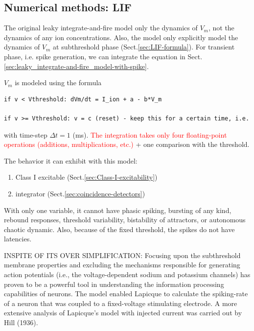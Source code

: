 % 




\subsection{Numerical methods: LIF}

The original leaky integrate-and-fire model only the dynamics of $V_m$, not the
dynamics of any ion concentrations.
Also, the model only explicitly model the dynamics of $V_m$ at subthreshold
phase (Sect.\ref{sec:LIF-formula}). For transient phase, i.e. spike generation,
we can integrate the equation in
Sect.\ref{sec:leaky_integrate-and-fire_model-with-spike}.


$V_m$ is modeled using the formula
\begin{verbatim}
if v < Vthreshold: dVm/dt = I_ion + a - b*V_m

if v >= Vthreshold: v = c (reset) - keep this for a certain time, i.e. 
\end{verbatim}
with time-step $\Delta t = 1$ (ms).
\textcolor{red}{The integration takes 
only four  floating-point operations (additions, multiplications, etc.)} + one
comparison with the threshold.

The behavior it can exhibit with this model:
\begin{enumerate}
  \item Class I excitable (Sect.\ref{sec:Class-I-excitability})
  \item integrator (Sect.\ref{sec:coincidence-detectors})
\end{enumerate}

With only one variable, it cannot have phasic spiking, bursting of any  kind,
rebound  responses,  threshold  variability,  bistability of attractors, or
autonomous chaotic dynamic. Also, because of the fixed threshold, the spikes do
not have latencies.


INSPITE OF ITS OVER SIMPLIFICATION:
Focusing upon the subthreshold membrane properties and excluding the mechanisms
responsible for generating action potentials (i.e., the voltage-dependent sodium
and potassium channels) has proven to be a powerful tool in understanding the
information processing capabilities of neurons.
The model enabled Lapicque to calculate the spiking-rate of a neuron that was
coupled to a fixed-voltage stimulating electrode.
A more extensive analysis of Lapicque's model with injected current was carried
out by Hill (1936).



